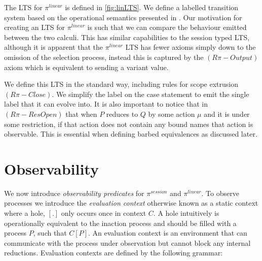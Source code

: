 
The LTS for $\pi^{linear}$ is defined in \autoref{fig:linLTS}. We define a labelled transition system based on the operational semantics presented in \cite{dardha2017session}. Our motivation for creating an LTS for $\pi^{linear}$ is such that we can compare the behaviour emitted between the two calculi. This has similar capabilities to the session typed LTS, although it is apparent that the $\pi^{linear}$ LTS has fewer axioms simply down to the omission of the selection process, instead this is captured by the $(R\pi-Output)$ axiom which is equivalent to sending a variant value.  

We define this LTS in the standard way, including rules for scope extrusion $(R\pi-Close)$. We simplify the label on the case statement to emit the single label that it can evolve into. It is also important to notice that in $(R\pi-ResOpen)$ that when $P$ reduces to $Q$ by some action $\mu$ and it is under some restriction, if that action does not contain any bound names that action is observable. This is essential when defining barbed equivalences as discussed later.
 
\section{Observability} \label{sec:Observables}

We now introduce \textit{observability predicates} for $\pi^{session}$ and $\pi^{linear}$. To observe processes we introduce the \textit{evaluation context} \cite{DBLP:journals/jlp/FournetG05} otherwise known as a static context where a hole, $[.]$ only occurs once in context $C$. A hole intuitively is operationally equivalent to the inaction process and should be filled with a process $P$, such that $C[P]$. An evaluation context is an environment that can communicate with the process under observation but cannot block any internal reductions. Evaluation contexts are defined by the following grammar:

